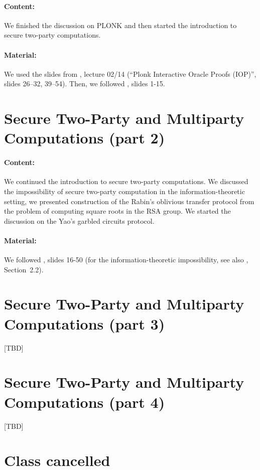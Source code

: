 \documentclass{llncs}
\begin{document}
\paragraph{Content:} We finished the discussion on PLONK and then started the introduction to secure two-party computations.

\paragraph{Material:}  We used the slides from \cite{ZKlearning}, lecture 02/14 (``Plonk Interactive Oracle Proofs (IOP)'', slides 26--32, 39--54). Then, we followed \cite{2PC}, slides 1-15.


\section{Secure Two-Party and Multiparty Computations (part 2)}

\paragraph{Content:}
We continued the introduction to secure two-party computations. We discussed the impossibility of secure two-party computation in the information-theoretic setting, we presented construction of the Rabin's oblivious transfer protocol from the problem of computing square roots in the RSA group. We started the discussion on the Yao's garbled circuits protocol.

\paragraph{Material:} We followed \cite{MPC}, slides 16-50 (for the information-theoretic impossibility, see also \cite{Wichs17}, Section~2.2).

\section{Secure Two-Party and Multiparty Computations (part 3)}

[TBD]

\section{Secure Two-Party and Multiparty Computations (part 4)}

[TBD]


\section{Class cancelled}
\end{document}
